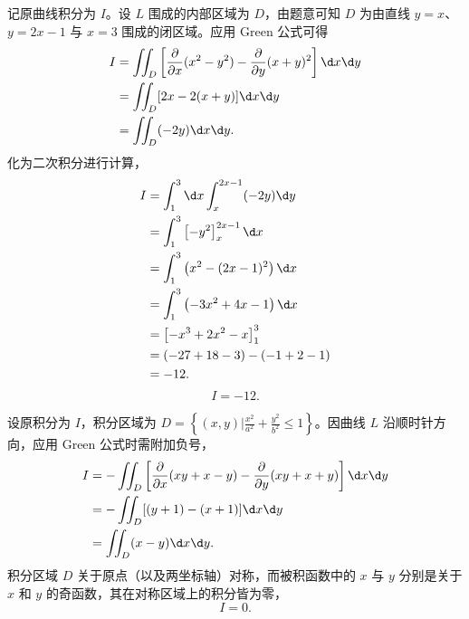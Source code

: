 \begin{solution}

    记原曲线积分为 $I$。设 $L$ 围成的内部区域为 $D$，由题意可知 $D$ 为由直线 $y=x$、$y=2x-1$ 与 $x=3$ 围成的闭区域。应用 Green 公式可得
    \begin{equation}
        \begin{aligned}
            I & = \iint_D \left[ \frac{\partial}{\partial x}(x^2-y^2) - \frac{\partial}{\partial y}(x+y)^2 \right] \d x \d y \\
              & = \iint_D [2x - 2(x+y)] \d x \d y                                                                            \\
              & = \iint_D (-2y) \d x \d y.
        \end{aligned}
    \end{equation}
    化为二次积分进行计算，
    \begin{equation}
        \begin{aligned}
            I & = \int_1^3 \d x \int_x^{2x-1} (-2y) \d y      \\
              & = \int_1^3 \left[ -y^2 \right]_x^{2x-1} \d x  \\
              & = \int_1^3 \left( x^2 - (2x-1)^2 \right) \d x \\
              & = \int_1^3 \left( -3x^2 + 4x - 1 \right) \d x \\
              & = \left[ -x^3 + 2x^2 - x \right]_1^3          \\
              & = (-27 + 18 - 3) - (-1 + 2 - 1)               \\
              & = -12.
        \end{aligned}
    \end{equation}
    \begin{equation}
        I = \boxed{-12}.
    \end{equation}


    设原积分为 $I$，积分区域为 $D = \left\{ (x, y) \mathrel{\big|} \frac{x^2}{a^2} + \frac{y^2}{b^2} \le 1 \right\}$。因曲线 $L$ 沿顺时针方向，应用 Green 公式时需附加负号，
    \begin{equation}
        \begin{aligned}
            I & = -\iint_D \left[ \frac{\partial}{\partial x}(xy+x-y) - \frac{\partial}{\partial y}(xy+x+y) \right] \d x \d y \\
              & = -\iint_D [ (y+1) - (x+1) ] \d x \d y                                                                        \\
              & = \iint_D (x-y) \d x \d y.
        \end{aligned}
    \end{equation}
    积分区域 $D$ 关于原点（以及两坐标轴）对称，而被积函数中的 $x$ 与 $y$ 分别是关于 $x$ 和 $y$ 的奇函数，其在对称区域上的积分皆为零，
    \begin{equation}
        I = \boxed{0}.
    \end{equation}


\end{solution}
